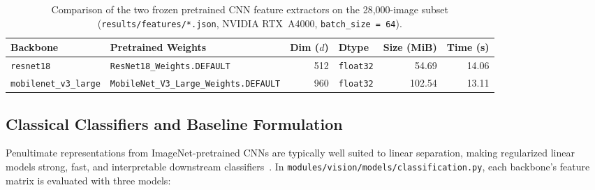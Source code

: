 \documentclass[12pt,a4paper]{article}
\newcommand{\code}[1]{\texttt{#1}}
\begin{document}
\begin{table}[H]
  \centering
  \caption[Comparison of pretrained CNN feature extractors]{Comparison of the two frozen pretrained CNN feature extractors on the 28,000-image subset (\code{results/\allowbreak{}features/\allowbreak{}*.json}, NVIDIA RTX~A4000, \code{batch\_\allowbreak{}size = 64}).}
  \label{tab:extractors}
  \footnotesize
  \setlength{\tabcolsep}{4.5pt}
  \begin{tabularx}{\textwidth}{@{}l Y r l r r@{}}
    \toprule
    \textbf{Backbone} & \textbf{Pretrained Weights} & \textbf{Dim ($d$)} & \textbf{Dtype} & \textbf{Size (MiB)} & \textbf{Time (s)} \\
    \midrule
    \code{resnet18} & \code{ResNet18\_\allowbreak{}Weights.DEFAULT} & 512 & \code{float32} & 54.69 & 14.06 \\
    \code{mobilenet\_\allowbreak{}v3\_\allowbreak{}large} & \code{MobileNet\_\allowbreak{}V3\_\allowbreak{}Large\_\allowbreak{}Weights.DEFAULT} & 960 & \code{float32} & 102.54 & 13.11 \\
    \bottomrule
  \end{tabularx}
\end{table}

\subsection{Classical Classifiers and Baseline Formulation}
\label{subsec:classifiers}

Penultimate representations from ImageNet-pretrained CNNs are typically well suited to linear separation, making regularized linear models strong, fast, and interpretable downstream classifiers~\cite{pedregosa2011scikit}. In \code{modules/\allowbreak{}vision/\allowbreak{}models/\allowbreak{}classification.py}, each backbone's feature matrix is evaluated with three models:
\end{document}
